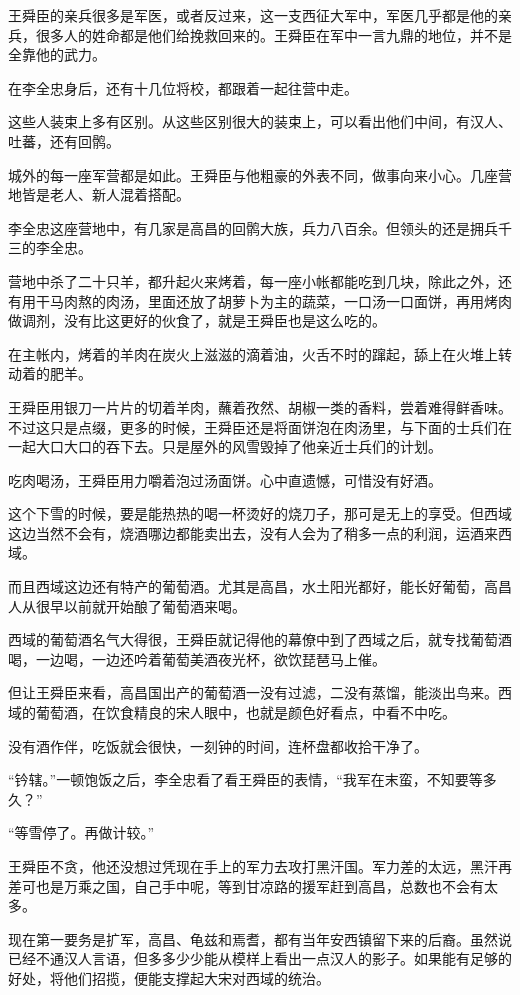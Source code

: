 王舜臣的亲兵很多是军医，或者反过来，这一支西征大军中，军医几乎都是他的亲兵，很多人的姓命都是他们给挽救回来的。王舜臣在军中一言九鼎的地位，并不是全靠他的武力。

在李全忠身后，还有十几位将校，都跟着一起往营中走。

这些人装束上多有区别。从这些区别很大的装束上，可以看出他们中间，有汉人、吐蕃，还有回鹘。

城外的每一座军营都是如此。王舜臣与他粗豪的外表不同，做事向来小心。几座营地皆是老人、新人混着搭配。

李全忠这座营地中，有几家是高昌的回鹘大族，兵力八百余。但领头的还是拥兵千三的李全忠。

营地中杀了二十只羊，都升起火来烤着，每一座小帐都能吃到几块，除此之外，还有用干马肉熬的肉汤，里面还放了胡萝卜为主的蔬菜，一口汤一口面饼，再用烤肉做调剂，没有比这更好的伙食了，就是王舜臣也是这么吃的。

在主帐内，烤着的羊肉在炭火上滋滋的滴着油，火舌不时的蹿起，舔上在火堆上转动着的肥羊。

王舜臣用银刀一片片的切着羊肉，蘸着孜然、胡椒一类的香料，尝着难得鲜香味。不过这只是点缀，更多的时候，王舜臣还是将面饼泡在肉汤里，与下面的士兵们在一起大口大口的吞下去。只是屋外的风雪毁掉了他亲近士兵们的计划。

吃肉喝汤，王舜臣用力嚼着泡过汤面饼。心中直遗憾，可惜没有好酒。

这个下雪的时候，要是能热热的喝一杯烫好的烧刀子，那可是无上的享受。但西域这边当然不会有，烧酒哪边都能卖出去，没有人会为了稍多一点的利润，运酒来西域。

而且西域这边还有特产的葡萄酒。尤其是高昌，水土阳光都好，能长好葡萄，高昌人从很早以前就开始酿了葡萄酒来喝。

西域的葡萄酒名气大得很，王舜臣就记得他的幕僚中到了西域之后，就专找葡萄酒喝，一边喝，一边还吟着葡萄美酒夜光杯，欲饮琵琶马上催。

但让王舜臣来看，高昌国出产的葡萄酒一没有过滤，二没有蒸馏，能淡出鸟来。西域的葡萄酒，在饮食精良的宋人眼中，也就是颜色好看点，中看不中吃。

没有酒作伴，吃饭就会很快，一刻钟的时间，连杯盘都收拾干净了。

“钤辖。”一顿饱饭之后，李全忠看了看王舜臣的表情，“我军在末蛮，不知要等多久？”

“等雪停了。再做计较。”

王舜臣不贪，他还没想过凭现在手上的军力去攻打黑汗国。军力差的太远，黑汗再差可也是万乘之国，自己手中呢，等到甘凉路的援军赶到高昌，总数也不会有太多。

现在第一要务是扩军，高昌、龟兹和焉耆，都有当年安西镇留下来的后裔。虽然说已经不通汉人言语，但多多少少能从模样上看出一点汉人的影子。如果能有足够的好处，将他们招揽，便能支撑起大宋对西域的统治。

